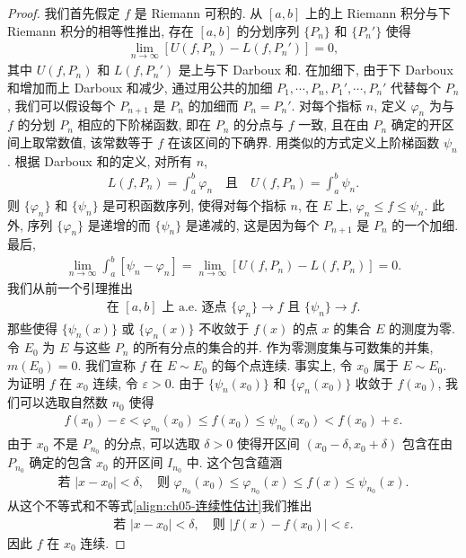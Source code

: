 \documentclass[../../main.tex]{subfiles}
\begin{document}
\begin{proof}
我们首先假定 $f$ 是 Riemann 可积的. 从 $[a,b]$ 上的上 Riemann 积分与下 Riemann 积分的相等性推出, 存在 $[a,b]$ 的分划序列 $\{P_{n}\}$ 和 $\{P_{n}'\}$ 使得
\begin{align*}
\lim_{n\to\infty}[U(f,P_{n})-L(f,P_{n}')]=0,
\end{align*}
其中 $U(f,P_{n})$ 和 $L(f,P_{n}')$ 是上与下 Darboux 和. 在加细下, 由于下 Darboux 和增加而上 Darboux 和减少, 通过用公共的加细 $P_{1},\cdots,P_{n},P_{1}',\cdots,P_{n}'$ 代替每个 $P_{n}$, 我们可以假设每个 $P_{n+1}$ 是 $P_{n}$ 的加细而 $P_{n}=P_{n}'$. 对每个指标 $n$, 定义 $\varphi_{n}$ 为与 $f$ 的分划 $P_{n}$ 相应的下阶梯函数, 即在 $P_{n}$ 的分点与 $f$ 一致, 且在由 $P_{n}$ 确定的开区间上取常数值, 该常数等于 $f$ 在该区间的下确界. 用类似的方式定义上阶梯函数 $\psi_{n}$. 根据 Darboux 和的定义, 对所有 $n$,
\begin{align*}
L(f,P_{n})=\int_{a}^{b}\varphi_{n}\quad\text{且}\quad U(f,P_{n})=\int_{a}^{b}\psi_{n}.
\end{align*}
则 $\{\varphi_{n}\}$ 和 $\{\psi_{n}\}$ 是可积函数序列, 使得对每个指标 $n$, 在 $E$ 上, $\varphi_{n}\leqslant f\leqslant\psi_{n}$. 此外, 序列 $\{\varphi_{n}\}$ 是递增的而 $\{\psi_{n}\}$ 是递减的, 这是因为每个 $P_{n+1}$ 是 $P_{n}$ 的一个加细. 最后,
\begin{align*}
\lim_{n\to\infty}\int_{a}^{b}[\psi_{n}-\varphi_{n}]=\lim_{n\to\infty}[U(f,P_{n})-L(f,P_{n})]=0.
\end{align*}
我们从前一个引理推出
\begin{align*}
\text{在 }[a,b]\text{ 上 a.e. 逐点 }\{\varphi_{n}\}\to f\text{ 且 }\{\psi_{n}\}\to f.
\end{align*}
那些使得 $\{\psi_{n}(x)\}$ 或 $\{\varphi_{n}(x)\}$ 不收敛于 $f(x)$ 的点 $x$ 的集合 $E$ 的测度为零. 令 $E_{0}$ 为 $E$ 与这些 $P_{n}$ 的所有分点的集合的并. 作为零测度集与可数集的并集, $m(E_{0})=0$. 我们宣称 $f$ 在 $E\sim E_{0}$ 的每个点连续. 事实上, 令 $x_{0}$ 属于 $E\sim E_{0}$. 为证明 $f$ 在 $x_{0}$ 连续, 令 $\varepsilon>0$. 由于 $\{\psi_{n}(x_{0})\}$ 和 $\{\varphi_{n}(x_{0})\}$ 收敛于 $f(x_{0})$, 我们可以选取自然数 $n_{0}$ 使得
\begin{align}
f(x_{0})-\varepsilon<\varphi_{n_{0}}(x_{0})\leqslant f(x_{0})\leqslant\psi_{n_{0}}(x_{0})<f(x_{0})+\varepsilon.\label{align:ch05-连续性估计}
\end{align}
由于 $x_{0}$ 不是 $P_{n_{0}}$ 的分点, 可以选取 $\delta>0$ 使得开区间 $(x_{0}-\delta,x_{0}+\delta)$ 包含在由 $P_{n_{0}}$ 确定的包含 $x_{0}$ 的开区间 $I_{n_{0}}$ 中. 这个包含蕴涵
\begin{align*}
\text{若 }|x-x_{0}|<\delta,\quad\text{则 }\varphi_{n_{0}}(x_{0})\leqslant\varphi_{n_{0}}(x)\leqslant f(x)\leqslant\psi_{n_{0}}(x).
\end{align*}
从这个不等式和不等式\eqref{align:ch05-连续性估计}我们推出
\begin{align*}
\text{若 }|x-x_{0}|<\delta,\quad\text{则 }|f(x)-f(x_{0})|<\varepsilon.
\end{align*}
因此 $f$ 在 $x_{0}$ 连续.


\end{proof}
\end{document}
